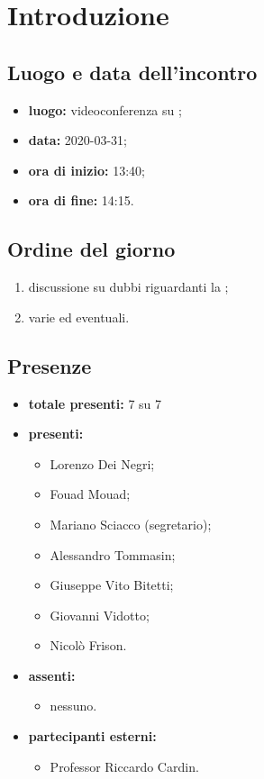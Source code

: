 \section*{Introduzione}

\subsection*{Luogo e data dell'incontro}
	\begin{itemize}
		\item \textbf{luogo:} videoconferenza su ;
		\item \textbf{data:} 2020-03-31;
		\item \textbf{ora di inizio:} 13:40;
		\item \textbf{ora di fine:} 14:15.
	\end{itemize}

\subsection*{Ordine del giorno}
	\begin{enumerate}
			\item discussione su dubbi riguardanti la ;
  			\item varie ed eventuali.
	\end{enumerate}

\subsection*{Presenze}
	\begin{itemize}
		\item \textbf{totale presenti:} 7 su 7
		\item \textbf{presenti: }
			\begin{itemize}
				\item Lorenzo Dei Negri;
				\item Fouad Mouad;
				\item Mariano Sciacco (segretario);
				\item Alessandro Tommasin;
				\item Giuseppe Vito Bitetti;
				\item Giovanni Vidotto;
				\item Nicolò Frison.
			\end{itemize}
		\item \textbf{assenti: }
			\begin{itemize}
				\item nessuno.
			\end{itemize}
		\item  \textbf{partecipanti esterni:}
			\begin{itemize}
				\item Professor Riccardo Cardin.
			\end{itemize}
	\end{itemize}


